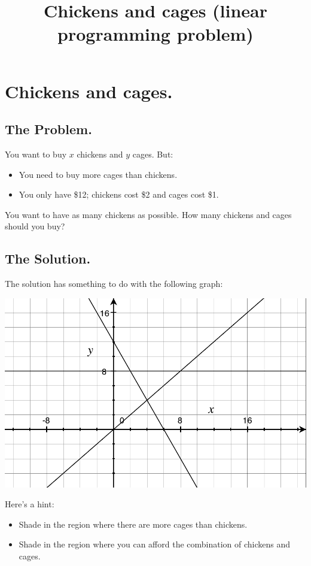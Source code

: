 \documentclass[12pt]{article}
\title{Chickens and cages (linear programming problem)}
\begin{document}
\Large

\section*{Chickens and cages.}

\subsection*{The Problem.}

You want to buy $x$ chickens and $y$ cages.  But:
\begin{itemize}
\item You need to buy more cages than chickens.
\item You only have \$12; chickens cost \$2 and cages cost \$1.
\end{itemize}
You want to have as many chickens as possible.  How many chickens and
cages should you buy?

\subsection*{The Solution.}

The solution has something to do with the following graph:
\begin{center}
\includegraphics{chicken-inequality-graph.pdf}
\end{center}

Here's a hint:
\begin{itemize}
\item Shade in the region where there are more cages than chickens.
\item Shade in the region where you can afford the combination of chickens and cages.
\end{itemize}
\end{document}

